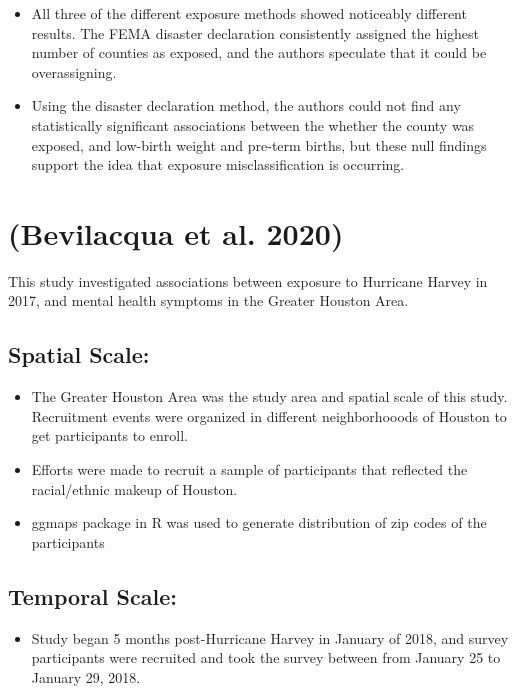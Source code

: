 \documentclass[
]{article}
\providecommand{\tightlist}{%
  \setlength{\itemsep}{0pt}\setlength{\parskip}{0pt}}
\begin{document}
\begin{itemize}
\tightlist
\item
  All three of the different exposure methods showed noticeably
  different results. The FEMA disaster declaration consistently assigned
  the highest number of counties as exposed, and the authors speculate
  that it could be overassigning.
\item
  Using the disaster declaration method, the authors could not find any
  statistically significant associations between the whether the county
  was exposed, and low-birth weight and pre-term births, but these null
  findings support the idea that exposure misclassification is
  occurring.
\end{itemize}

\hypertarget{bevilacqua2020understanding}{%
\section{(Bevilacqua et al. 2020)}\label{bevilacqua2020understanding}}

This study investigated associations between exposure to Hurricane
Harvey in 2017, and mental health symptoms in the Greater Houston Area.

\hypertarget{spatial-scale-8}{%
\subsection{Spatial Scale:}\label{spatial-scale-8}}

\begin{itemize}
\tightlist
\item
  The Greater Houston Area was the study area and spatial scale of this
  study. Recruitment events were organized in different neighborhooods
  of Houston to get participants to enroll.
\item
  Efforts were made to recruit a sample of participants that reflected
  the racial/ethnic makeup of Houston.
\item
  ggmaps package in R was used to generate distribution of zip codes of
  the participants
\end{itemize}

\hypertarget{temporal-scale-8}{%
\subsection{Temporal Scale:}\label{temporal-scale-8}}

\begin{itemize}
\tightlist
\item
  Study began 5 months post-Hurricane Harvey in January of 2018, and
  survey participants were recruited and took the survey between from
  January 25 to January 29, 2018.
\end{itemize}
\end{document}
